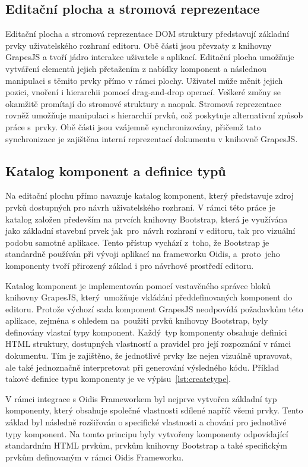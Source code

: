\subsection{Editační plocha a stromová reprezentace}
Editační plocha a stromová reprezentace DOM struktury představují základní prvky uživatelského rozhraní editoru. Obě části jsou převzaty z knihovny GrapesJS a tvoří jádro interakce uživatele s aplikací. Editační plocha umožňuje vytváření elementů jejich přetažením z nabídky komponent a následnou manipulaci s těmito prvky přímo v rámci plochy. Uživatel může měnit jejich pozici, vnoření i hierarchii pomocí drag-and-drop operací. Veškeré změny se okamžitě promítají do stromové struktury a naopak. Stromová reprezentace rovněž umožňuje manipulaci s hierarchií prvků, což poskytuje alternativní způsob práce s~prvky. Obě části jsou vzájemně synchronizovány, přičemž tato synchronizace je zajištěna interní reprezentací dokumentu v knihovně GrapesJS.

\subsection{Katalog komponent a definice typů}
Na editační plochu přímo navazuje katalog komponent, který představuje zdroj prvků dostupných pro návrh uživatelského rozhraní.
V rámci této práce je katalog založen především na prvcích knihovny Bootstrap, která je využívána jako základní stavební prvek jak~pro~návrh rozhraní v editoru, tak pro vizuální podobu samotné aplikace. Tento přístup vychází z~toho, že Bootstrap je standardně používán při vývoji aplikací na frameworku Oidis, a~proto~jeho komponenty tvoří přirozený základ i pro návrhové prostředí editoru.

Katalog komponent je implementován pomocí vestavěného správce bloků knihovny GrapesJS, který~umožňuje vkládání předdefinovaných komponent do editoru. Protože výchozí sada komponent GrapesJS neodpovídá požadavkům této aplikace, zejména s ohledem na~použiti prvků knihovny Bootstrap, byly definovány vlastní typy komponent. Každý~typ komponenty obsahuje definici HTML struktury, dostupných vlastností a pravidel pro její rozpoznání v rámci dokumentu. Tím je zajištěno, že jednotlivé prvky lze nejen vizuálně upravovat, ale také jednoznačně interpretovat při generování výsledného kódu. Příklad takové definice typu komponenty je ve výpisu~\ref{lst:createtype}.

V rámci integrace s Oidis Frameworkem byl nejprve vytvořen základní typ komponenty, který obsahuje společné vlastnosti sdílené napříč všemi prvky. Tento základ byl následně rozšiřován o specifické vlastnosti a chování pro jednotlivé typy komponent. Na tomto principu byly vytvořeny komponenty odpovídající standardním HTML prvkům, prvkům knihovny Bootstrap a také specifickým prvkům definovaným v rámci Oidis Frameworku.

